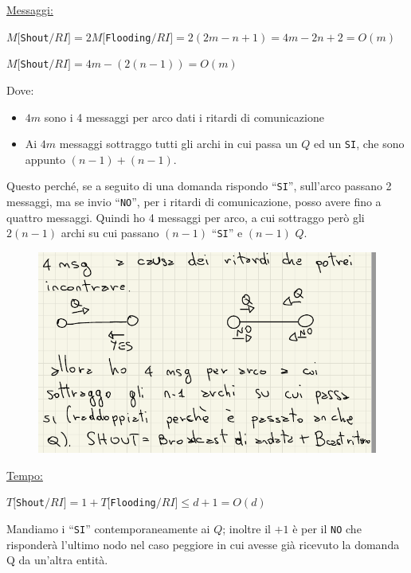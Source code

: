 \underline{Messaggi:}
\begin{center}
    $M[$\texttt{Shout}$/RI] = 2 M[$\texttt{Flooding}$/RI] = 2(2m-n+1) = 4m - 2n +
        2 = O(m)$
\end{center}
\begin{center}
    $M[$\texttt{Shout}$/RI] = 4m - (2(n-1)) = O(m)$
\end{center}
Dove:
\begin{itemize}
    \item $4m$ sono i 4 messaggi per arco dati i ritardi di comunicazione
    \item Ai $4m$ messaggi sottraggo tutti gli archi in cui passa un $Q$ ed un
          \texttt{SI}, che sono appunto $(n-1) + (n-1)$.
\end{itemize}

Questo perché, se a seguito di una domanda rispondo ``\texttt{SI}'', sull'arco
passano 2 messaggi, ma se invio ``\texttt{NO}'', per i ritardi di comunicazione, posso
avere fino a quattro messaggi. Quindi ho 4 messaggi per arco, a cui sottraggo
però gli $2(n-1)$ archi su cui passano $(n-1)$ ``\texttt{SI}'' e $(n-1)$ $Q$.

\begin{figure}[H]
    \centering
    \includegraphics[width=\linewidth, keepaspectratio]{capitoli/costruzione-spanning-tree/imgs/hh}
\end{figure}

\underline{Tempo:}
\begin{center}
    $T[$\texttt{Shout}$/RI] = 1 + T[$\texttt{Flooding}$/RI] \leq d + 1 = O(d)$
\end{center}
Mandiamo i ``\texttt{SI}'' contemporaneamente ai $Q$; inoltre il $+1$ è per il
\texttt{NO} che risponderà l'ultimo nodo nel caso peggiore in cui avesse già
ricevuto la domanda Q da un'altra entità.

